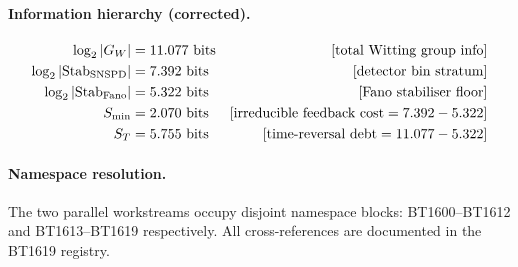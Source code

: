 \paragraph{Information hierarchy (corrected).}
\begin{align*}
  \log_2|G_W|                  &= 11.077~\text{bits} &\text{[total Witting group info]} \\
  \log_2|{\rm Stab}_{\rm SNSPD}| &=  7.392~\text{bits} &\text{[detector bin stratum]} \\
  \log_2|{\rm Stab}_{\rm Fano}|  &=  5.322~\text{bits} &\text{[Fano stabiliser floor]} \\
  S_{\min}                     &=  2.070~\text{bits} &\text{[irreducible feedback cost} = 7.392 - 5.322\text{]} \\
  S_T                          &=  5.755~\text{bits} &\text{[time-reversal debt} = 11.077 - 5.322\text{]}
\end{align*}

\paragraph{Namespace resolution.}
The two parallel workstreams occupy disjoint namespace blocks:
BT1600--BT1612 and BT1613--BT1619 respectively.
All cross-references are documented in the BT1619 registry.
